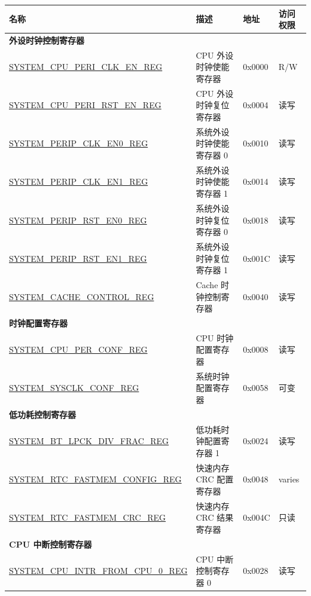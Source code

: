 \begin{longtable}{ | p{6.5cm} | p{5.5cm} | p{1.3cm} | p{2cm} | }
\hline\rowcolor{lightgray}
名称 & 描述 & 地址 & 访问权限  \\ \hline
\endhead
\multicolumn{4}{|l|}{\textbf{外设时钟控制寄存器}} \\ \hline
\hyperref[regdesc:SYSTEMCPUPERICLKENREG]{SYSTEM\_CPU\_PERI\_CLK\_EN\_REG} & CPU 外设时钟使能寄存器 & 0x0000 & R/W \\ \hline
\hyperref[regdesc:SYSTEMCPUPERIRSTENREG]{SYSTEM\_CPU\_PERI\_RST\_EN\_REG} & CPU 外设时钟复位寄存器 & 0x0004 & 读写 \\ \hline
\hyperref[regdesc:SYSTEMPERIPCLKEN0REG]{SYSTEM\_PERIP\_CLK\_EN0\_REG} & 系统外设时钟使能寄存器 0 & 0x0010 & 读写 \\ \hline
\hyperref[regdesc:SYSTEMPERIPCLKEN1REG]{SYSTEM\_PERIP\_CLK\_EN1\_REG} & 系统外设时钟使能寄存器 1 & 0x0014 & 读写 \\ \hline
\hyperref[regdesc:SYSTEMPERIPRSTEN0REG]{SYSTEM\_PERIP\_RST\_EN0\_REG} & 系统外设时钟复位寄存器 0 & 0x0018 & 读写 \\ \hline
\hyperref[regdesc:SYSTEMPERIPRSTEN1REG]{SYSTEM\_PERIP\_RST\_EN1\_REG} & 系统外设时钟复位寄存器 1 & 0x001C & 读写 \\ \hline
\hyperref[regdesc:SYSTEMCACHECONTROLREG]{SYSTEM\_CACHE\_CONTROL\_REG} & Cache 时钟控制寄存器 & 0x0040 & 读写 \\ \hline
\multicolumn{4}{|l|}{\textbf{时钟配置寄存器}} \\ \hline
\hyperref[regdesc:SYSTEMCPUPERCONFREG]{SYSTEM\_CPU\_PER\_CONF\_REG} & CPU 时钟配置寄存器 & 0x0008 & 读写 \\ \hline
\hyperref[regdesc:SYSTEMSYSCLKCONFREG]{SYSTEM\_SYSCLK\_CONF\_REG} & 系统时钟配置寄存器 & 0x0058 & 可变 \\ \hline
\multicolumn{4}{|l|}{\textbf{低功耗控制寄存器}} \\ \hline
\hyperref[regdesc:SYSTEMBTLPCKDIVFRACREG]{SYSTEM\_BT\_LPCK\_DIV\_FRAC\_REG} & 低功耗时钟配置寄存器 1 & 0x0024 & 读写 \\ \hline
\hyperref[regdesc:SYSTEMRTCFASTMEMCONFIGREG]{SYSTEM\_RTC\_FASTMEM\_CONFIG\_REG} & 快速内存 CRC 配置寄存器 & 0x0048 & varies \\ \hline
\hyperref[regdesc:SYSTEMRTCFASTMEMCRCREG]{SYSTEM\_RTC\_FASTMEM\_CRC\_REG} & 快速内存 CRC 结果寄存器 & 0x004C & 只读 \\ \hline
\multicolumn{4}{|l|}{\textbf{CPU 中断控制寄存器}} \\ \hline
\hyperref[regdesc:SYSTEMCPUINTRFROMCPU0REG]{SYSTEM\_CPU\_INTR\_FROM\_CPU\_0\_REG} & CPU 中断控制寄存器 0 & 0x0028 & 读写 \\ \hline

\end{longtable}
